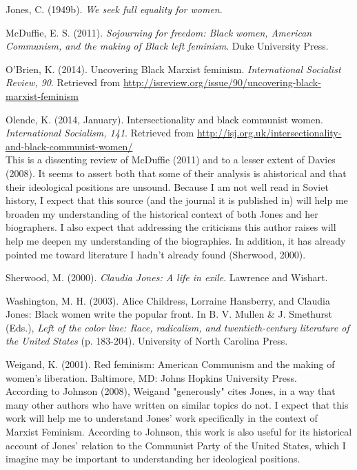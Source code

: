 \documentclass[doc,12pt]{apa6}
\begin{document}
\noindent
Jones, C. (1949b). \emph{We seek full equality for women}.

\noindent
McDuffie, E. S. (2011). \emph{Sojourning for freedom: Black women, American Communism, and the making of Black left feminism}. Duke University Press.

\noindent
O'Brien, K. (2014). Uncovering Black Marxist feminism. \emph{International Socialist Review, 90}. Retrieved from \url{http://isreview.org/issue/90/uncovering-black-marxist-feminism}

\noindent
Olende, K. (2014, January). Intersectionality and black communist women. \emph{International Socialism, 141}. Retrieved from \url{http://isj.org.uk/intersectionality-and-black-communist-women/}
\vspace{6pt} \\ \-\hspace{1em}
This is a dissenting review of McDuffie (2011) and to a lesser extent of Davies
(2008). It seems to assert both that some of their analysis is ahistorical and
that their ideological positions are unsound. Because I am not well read in
Soviet history, I expect that this source (and the journal it is published in)
will help me broaden my understanding of the historical context of both Jones
and her biographers. I also expect that addressing the criticisms this author
raises will help me deepen my understanding of the biographies. In addition, it
has already pointed me toward literature I hadn't already found (Sherwood,
2000).

\noindent
Sherwood, M. (2000). \emph{Claudia Jones: A life in exile}. Lawrence and Wishart.

\noindent
Washington, M. H. (2003). Alice Childress, Lorraine Hansberry, and Claudia Jones: Black women write the popular front. In B. V. Mullen \& J. Smethurst (Eds.), \emph{Left of the color line: Race, radicalism, and twentieth-century literature of the United States} (p. 183-204). University of North Carolina Press.

\noindent
Weigand, K. (2001). Red feminism: American Communism and the making of women's liberation. Baltimore, MD: Johns Hopkins University Press.
\vspace{6pt} \\ \-\hspace{1em}
According to Johnson (2008), Weigand "generously" cites Jones, in a way that
many other authors who have written on similar topics do not. I expect that
this work will help me to understand Jones' work specifically in the context of
Marxist Feminism. According to Johnson, this work is also useful for its
historical account of Jones' relation to the Communist Party of the United
States, which I imagine may be important to understanding her ideological
positions.


% 
% 
\end{document}
